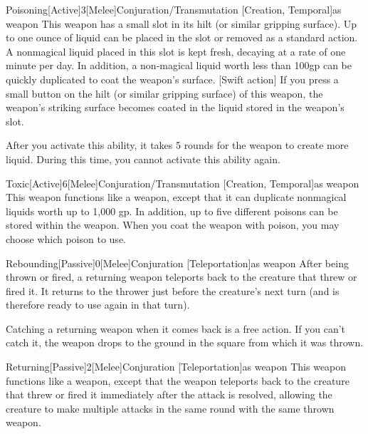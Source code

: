         \begin{magicitemdef}{Poisoning}[Active]{3}[Melee]{Conjuration/Transmutation [Creation, Temporal]}{as weapon}
             This weapon has a small slot in its hilt (or similar gripping surface). Up to one ounce of liquid can be placed in the slot or removed as a standard action. A nonmagical liquid placed in this slot is kept fresh, decaying at a rate of one minute per day. In addition, a non-magical liquid worth less than 100gp can be quickly duplicated to coat the weapon's surface.
            [Swift action] If you press a small button on the hilt (or similar gripping surface) of this weapon, the weapon's striking surface becomes coated in the liquid stored in the weapon's slot.

            After you activate this ability, it takes 5 rounds for the weapon to create more liquid.
            During this time, you cannot activate this ability again.
        \end{magicitemdef}

        \begin{magicitemdef}{Toxic}[Active]{6}[Melee]{Conjuration/Transmutation [Creation, Temporal]}{as weapon}
             This weapon functions like a  weapon, except that it can duplicate nonmagical liquids worth up to 1,000 gp.
            In addition, up to five different poisons can be stored within the weapon.
            When you coat the weapon with poison, you may choose which poison to use.
        \end{magicitemdef}

        \begin{magicitemdef}{Rebounding}[Passive]{0}[Melee]{Conjuration [Teleportation]}{as weapon}
             After being thrown or fired, a returning weapon teleports back to the creature that threw or fired it.
            It returns to the thrower just before the creature's next turn (and is therefore ready to use again in that turn).

            Catching a returning weapon when it comes back is a free action.
            If you can't catch it, the weapon drops to the ground in the square from which it was thrown.
        \end{magicitemdef}

        \begin{magicitemdef}{Returning}[Passive]{2}[Melee]{Conjuration [Teleportation]}{as weapon}
             This weapon functions like a  weapon, except that the weapon teleports back to the creature that threw or fired it immediately after the attack is resolved, allowing the creature to make multiple attacks in the same round with the same thrown weapon.
        \end{magicitemdef}

